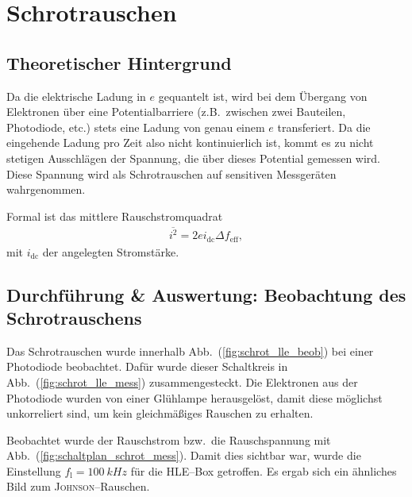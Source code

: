 \documentclass[sn-mathphys-num,iicol]{sn-jnl}
\theoremstyle{thmstyleone}
\theoremstyle{thmstyletwo}
\theoremstyle{thmstylethree}
\begin{document}
\section{Schrotrauschen}
\subsection{Theoretischer Hintergrund}
Da die elektrische Ladung in $e$ gequantelt ist, wird bei dem Übergang von Elektronen über eine Potentialbarriere (z.B.\ zwischen zwei Bauteilen, Photodiode, etc.) stets eine Ladung von genau einem $e$ transferiert.
Da die eingehende Ladung pro Zeit also nicht kontinuierlich ist, kommt es zu nicht stetigen Ausschlägen der Spannung, die über dieses Potential gemessen wird.
Diese Spannung wird als Schrotrauschen auf sensitiven Messgeräten wahrgenommen.

Formal ist das mittlere Rauschstromquadrat
\begin{align}
	\overline{i^2}=2ei_\text{dc}\Delta f_\text{eff}
	,\end{align}
mit $i_\text{dc}$ der angelegten Stromstärke.

\subsection{Durchführung \& Auswertung: Beobachtung des Schrotrauschens}
Das Schrotrauschen wurde innerhalb Abb.\ (\ref{fig:schrot_lle_beob}) bei einer Photodiode beobachtet.
Dafür wurde dieser Schaltkreis in Abb.\ (\ref{fig:schrot_lle_mess}) zusammengesteckt.
Die Elektronen aus der Photodiode wurden von einer Glühlampe herausgelöst, damit diese möglichst unkorreliert sind, um kein gleichmäßiges Rauschen zu erhalten.

Beobachtet wurde der Rauschstrom bzw.\ die Rauschspannung mit Abb.\ (\ref{fig:schaltplan_schrot_mess}).
Damit dies sichtbar war, wurde die Einstellung $f_\text{l}=\SI{100}{kHz}$ für die HLE--Box getroffen.
Es ergab sich ein ähnliches Bild zum \textsc{Johnson}--Rauschen. %
\end{document}
